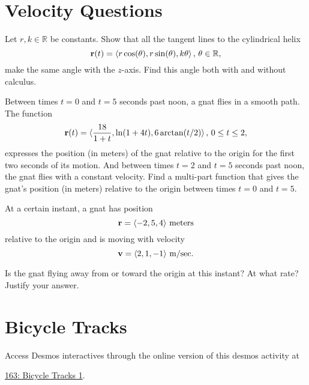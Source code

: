 \documentclass{ximera}
\begin{document}
\section{Velocity Questions}

\begin{question}  \label{Qvhyu55:Motion}
Let $r,k\in\mathbb{R}$ be constants. Show that all the tangent lines to the cylindrical helix
\[
  {\bf r}(t) =  \langle r \cos (\theta) , r \sin (\theta) , k \theta \rangle \, , \, \theta \in \mathbb{R}, 
\]
make the same angle with the $z$-axis. Find this angle both with and without calculus. 
\end{question}


\begin{question}  \label{Qdgtbyt5:Motion}
Between times $t=0$ and $t=5$ seconds past noon, a gnat flies in a smooth path. The function 
\[
       {\bf r}(t) =  \langle  \frac{18 }{1+t} , \ln (1+4t) , 6\arctan(t/2) \rangle \, , \, 0\leq t \leq 2 ,
\]
expresses the position (in meters) of the gnat relative to the origin for the first two seconds of its motion. And between times $t=2$ and $t=5$ seconds past noon, the gnat flies with a constant velocity. Find a multi-part function that gives the gnat's position (in meters) relative to the origin between times $t=0$ and $t=5$. 

\end{question}


\begin{question} \label{Qcbh65y6:Motion}
At a certain instant, a gnat has position
\[
   {\bf r} = \langle -2, 5, 4\rangle \text{ meters}
\]
relative to the origin and is moving with velocity
\[
  {\bf v} = \langle  2, 1,-1  \rangle \text{ m/sec} .
\]

Is the gnat flying away from or toward the origin at this instant? At what rate? Justify your answer.

\end{question}

\section{Bicycle Tracks}


\begin{exploration}

 
\begin{onlineOnly}
    \begin{center}
\end{center}
\end{onlineOnly}


Access Desmos interactives through the online version of this desmos activity at
 
\href{https://www.desmos.com/calculator/cuo1lynesx}{163: Bicycle Tracks 1}.


\end{exploration}
\end{document}
